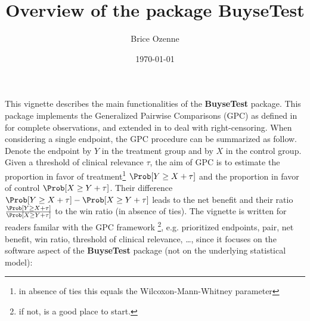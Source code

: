 \documentclass[12pt]{article}
\author{Brice Ozenne}
\date{\today}
\title{Overview of the package BuyseTest}
\begin{document}
\maketitle
This vignette describes the main functionalities of the \textbf{BuyseTest}
package. This package implements the Generalized Pairwise Comparisons
(GPC) as defined in \cite{buyse2010generalized} for complete
observations, and extended in \cite{peron2018extension} to deal with
right-censoring. When considering a single endpoint, the GPC procedure
can be summarized as follow. Denote the endpoint by \(Y\) in the
treatment group and by \(X\) in the control group. Given a threshold
of clinical relevance \(\tau\), the aim of GPC is to estimate the
proportion in favor of treatment\footnote{in absence of ties this equals
the Wilcoxon-Mann-Whitney parameter} \(\Prob[Y \geq X + \tau]\) and
the proportion in favor of control \(\Prob[X \geq Y + \tau]\). Their
difference \(\Prob[Y \geq X + \tau]-\Prob[X \geq Y + \tau]\) leads to
the net benefit and their ratio \(\frac{\Prob[Y \geq X +
\tau]}{\Prob[X \geq Y + \tau]}\) to the win ratio (in absence of
ties). The vignette is written for readers familar with the GPC
framework \footnote{if not, \cite{buyse2010generalized} is a good place to
start.}, e.g. prioritized endpoints, pair, net benefit, win ratio,
threshold of clinical relevance, \ldots, since it focuses on the
software aspect of the \textbf{BuyseTest} package (not on the underlying
statistical model):
\end{document}
